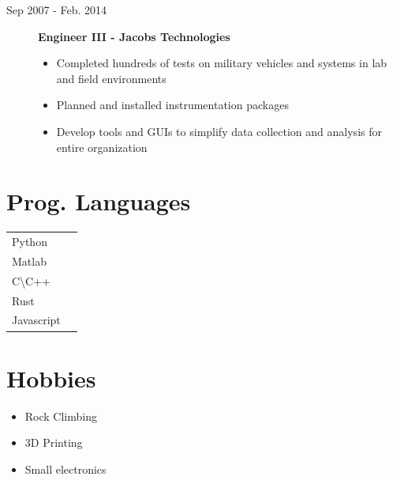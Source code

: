 \documentclass[a4paper,10pt]{article}
\begin{document}
\begin{adjustbox}{valign=t}
\begin{minipage}{0.6\textwidth}
\begin{description}
\item[\normalfont \textcolor{ColorOne}{Sep 2007 - Feb. 2014}] \textbf{Engineer III - Jacobs Technologies}
	\begin{itemize}[align=right, itemindent=-1.5em,leftmargin=0pt]
		\item Completed hundreds of tests on military vehicles and systems in lab and field environments
		\item Planned and installed instrumentation packages
		\item Develop tools and GUIs to simplify data collection and analysis for entire organization
	\end{itemize}
\end{description}

\MySkip

\begin{multicols}{2}
	\section*{Prog. Languages}
	\begin{tabular}{ll}
		Python & \SkillBull{$\bullet \bullet \bullet$}\\
		Matlab & \SkillBull{$\bullet \bullet \circ$}\\
		C\textbackslash C++ &\SkillBull{$\bullet \bullet \circ$}\\
		Rust &\SkillBull{$\bullet \circ \circ$}\\
		Javascript &\SkillBull{$\bullet \circ \circ$}\\
	\end{tabular}

	\vfill\null \columnbreak  %

	\section*{Hobbies}

	\begin{itemize}[noitemsep]
		\item Rock Climbing
		\item 3D Printing
		\item Small electronics
	\end{itemize}
\end{multicols}



\end{minipage}
\end{adjustbox}
\end{document}

